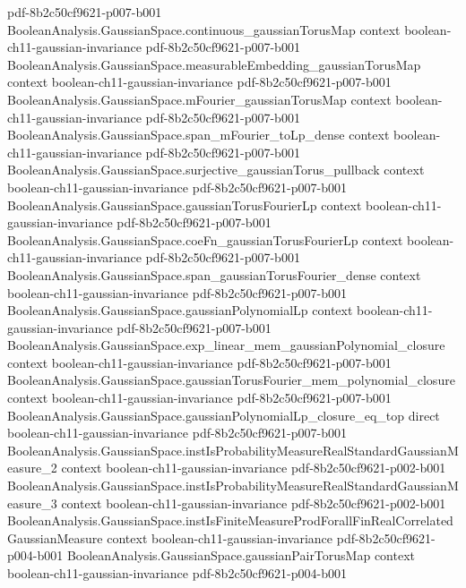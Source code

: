 \begin{lemma}
  {pdf-8b2c50cf9621-p007-b001}
\proofstep
  {BooleanAnalysis.GaussianSpace.continuous_gaussianTorusMap}
  {context}
  {boolean-ch11-gaussian-invariance}
  {pdf-8b2c50cf9621-p007-b001}
\proofstep
  {BooleanAnalysis.GaussianSpace.measurableEmbedding_gaussianTorusMap}
  {context}
  {boolean-ch11-gaussian-invariance}
  {pdf-8b2c50cf9621-p007-b001}
\proofstep
  {BooleanAnalysis.GaussianSpace.mFourier_gaussianTorusMap}
  {context}
  {boolean-ch11-gaussian-invariance}
  {pdf-8b2c50cf9621-p007-b001}
\proofstep
  {BooleanAnalysis.GaussianSpace.span_mFourier_toLp_dense}
  {context}
  {boolean-ch11-gaussian-invariance}
  {pdf-8b2c50cf9621-p007-b001}
\proofstep
  {BooleanAnalysis.GaussianSpace.surjective_gaussianTorus_pullback}
  {context}
  {boolean-ch11-gaussian-invariance}
  {pdf-8b2c50cf9621-p007-b001}
\proofstep
  {BooleanAnalysis.GaussianSpace.gaussianTorusFourierLp}
  {context}
  {boolean-ch11-gaussian-invariance}
  {pdf-8b2c50cf9621-p007-b001}
\proofstep
  {BooleanAnalysis.GaussianSpace.coeFn_gaussianTorusFourierLp}
  {context}
  {boolean-ch11-gaussian-invariance}
  {pdf-8b2c50cf9621-p007-b001}
\proofstep
  {BooleanAnalysis.GaussianSpace.span_gaussianTorusFourier_dense}
  {context}
  {boolean-ch11-gaussian-invariance}
  {pdf-8b2c50cf9621-p007-b001}
\proofstep
  {BooleanAnalysis.GaussianSpace.gaussianPolynomialLp}
  {context}
  {boolean-ch11-gaussian-invariance}
  {pdf-8b2c50cf9621-p007-b001}
\proofstep
  {BooleanAnalysis.GaussianSpace.exp_linear_mem_gaussianPolynomial_closure}
  {context}
  {boolean-ch11-gaussian-invariance}
  {pdf-8b2c50cf9621-p007-b001}
\proofstep
  {BooleanAnalysis.GaussianSpace.gaussianTorusFourier_mem_polynomial_closure}
  {context}
  {boolean-ch11-gaussian-invariance}
  {pdf-8b2c50cf9621-p007-b001}
\proofstep
  {BooleanAnalysis.GaussianSpace.gaussianPolynomialLp_closure_eq_top}
  {direct}
  {boolean-ch11-gaussian-invariance}
  {pdf-8b2c50cf9621-p007-b001}
\proofstep
  {BooleanAnalysis.GaussianSpace.instIsProbabilityMeasureRealStandardGaussianMeasure_2}
  {context}
  {boolean-ch11-gaussian-invariance}
  {pdf-8b2c50cf9621-p002-b001}
\proofstep
  {BooleanAnalysis.GaussianSpace.instIsProbabilityMeasureRealStandardGaussianMeasure_3}
  {context}
  {boolean-ch11-gaussian-invariance}
  {pdf-8b2c50cf9621-p002-b001}
\proofstep
  {BooleanAnalysis.GaussianSpace.instIsFiniteMeasureProdForallFinRealCorrelatedGaussianMeasure}
  {context}
  {boolean-ch11-gaussian-invariance}
  {pdf-8b2c50cf9621-p004-b001}
\proofstep
  {BooleanAnalysis.GaussianSpace.gaussianPairTorusMap}
  {context}
  {boolean-ch11-gaussian-invariance}
  {pdf-8b2c50cf9621-p004-b001}
\proofstep

\end{lemma}
